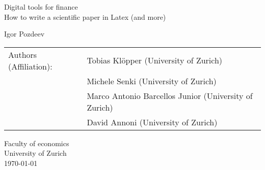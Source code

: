 \begin{titlepage}

    \begin{center}
        \vspace*{1cm}
        {\Large Digital tools for finance}\\[2.5cm]
        \Huge
        How to write a scientific paper in Latex (and more)
        
        \vspace{0.5cm}
        
        \Large

        
        \vspace{0.5cm}
        
        \normalsize

        \vspace{1.5cm}
        
        {\large Igor Pozdeev} \\[3cm]
        
        \begin{tabular}{ll}
        \hline
        {\small Authors (Affiliation):} & {\small Tobias Klöpper (University of Zurich)}\\
        & {\small Michele Senki (University of Zurich)}\\
        & {\small Marco Antonio Barcellos Junior (University of Zurich)}\\
        & {\small David Annoni (University of Zurich)}\\
        \hline
        \end{tabular}
        
        \vfill
        
        
        \vspace{0.8cm}
        
        
        Faculty of economics\\
        University of Zurich\\
        \today
        
    \end{center}
\end{titlepage}
